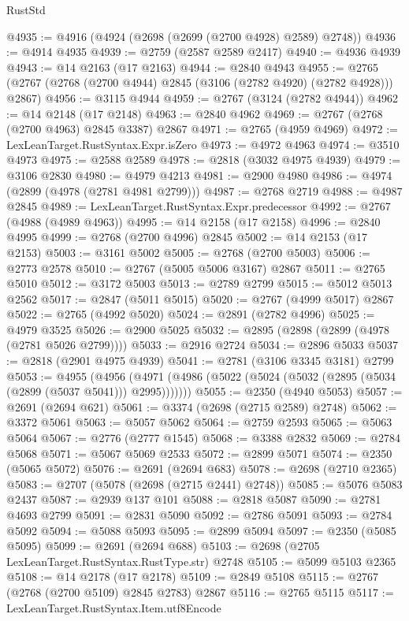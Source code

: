 \begin{lexlean}{RustStd}
\begin{coremodule}
@4935 := @4916 (@4924 (@2698 (@2699 (@2700 @4928) @2589) @2748))
@4936 := @4914 @4935
@4939 := @2759 (@2587 @2589 @2417)
@4940 := @4936 @4939
@4943 := @14 @2163 (@17 @2163)
@4944 := @2840 @4943
@4955 := @2765 (@2767 (@2768 (@2700 @4944) @2845 (@3106 (@2782 @4920) (@2782 @4928))) @2867)
@4956 := @3115 @4944
@4959 := @2767 (@3124 (@2782 @4944))
@4962 := @14 @2148 (@17 @2148)
@4963 := @2840 @4962
@4969 := @2767 (@2768 (@2700 @4963) @2845 @3387) @2867
@4971 := @2765 (@4959 @4969)
@4972 := LexLeanTarget.RustSyntax.Expr.isZero
@4973 := @4972 @4963
@4974 := @3510 @4973
@4975 := @2588 @2589
@4978 := @2818 (@3032 @4975 @4939)
@4979 := @3106 @2830
@4980 := @4979 @4213
@4981 := @2900 @4980
@4986 := @4974 (@2899 (@4978 (@2781 @4981 @2799)))
@4987 := @2768 @2719
@4988 := @4987 @2845
@4989 := LexLeanTarget.RustSyntax.Expr.predecessor
@4992 := @2767 (@4988 (@4989 @4963))
@4995 := @14 @2158 (@17 @2158)
@4996 := @2840 @4995
@4999 := @2768 (@2700 @4996) @2845
@5002 := @14 @2153 (@17 @2153)
@5003 := @3161 @5002
@5005 := @2768 (@2700 @5003)
@5006 := @2773 @2578
@5010 := @2767 (@5005 @5006 @3167) @2867
@5011 := @2765 @5010
@5012 := @3172 @5003
@5013 := @2789 @2799
@5015 := @5012 @5013 @2562
@5017 := @2847 (@5011 @5015)
@5020 := @2767 (@4999 @5017) @2867
@5022 := @2765 (@4992 @5020)
@5024 := @2891 (@2782 @4996)
@5025 := @4979 @3525
@5026 := @2900 @5025
@5032 := @2895 (@2898 (@2899 (@4978 (@2781 @5026 @2799))))
@5033 := @2916 @2724
@5034 := @2896 @5033
@5037 := @2818 (@2901 @4975 @4939)
@5041 := @2781 (@3106 @3345 @3181) @2799
@5053 := @4955
    (@4956 (@4971 (@4986 (@5022 (@5024 (@5032 (@2895 (@5034 (@2899 (@5037 @5041))) @2995)))))))
@5055 := @2350 (@4940 @5053)
@5057 := @2691 (@2694 @621)
@5061 := @3374 (@2698 (@2715 @2589) @2748)
@5062 := @3372 @5061
@5063 := @5057 @5062
@5064 := @2759 @2593
@5065 := @5063 @5064
@5067 := @2776 (@2777 @1545)
@5068 := @3388 @2832
@5069 := @2784 @5068
@5071 := @5067 @5069 @2533
@5072 := @2899 @5071
@5074 := @2350 (@5065 @5072)
@5076 := @2691 (@2694 @683)
@5078 := @2698 (@2710 @2365)
@5083 := @2707 (@5078 (@2698 (@2715 @2441) @2748))
@5085 := @5076 @5083 @2437
@5087 := @2939 @137 @101
@5088 := @2818 @5087
@5090 := @2781 @4693 @2799
@5091 := @2831 @5090
@5092 := @2786 @5091
@5093 := @2784 @5092
@5094 := @5088 @5093
@5095 := @2899 @5094
@5097 := @2350 (@5085 @5095)
@5099 := @2691 (@2694 @688)
@5103 := @2698 (@2705 LexLeanTarget.RustSyntax.RustType.str) @2748
@5105 := @5099 @5103 @2365
@5108 := @14 @2178 (@17 @2178)
@5109 := @2849 @5108
@5115 := @2767 (@2768 (@2700 @5109) @2845 @2783) @2867
@5116 := @2765 @5115
@5117 := LexLeanTarget.RustSyntax.Item.utf8Encode

\end{coremodule}
\end{lexlean}
